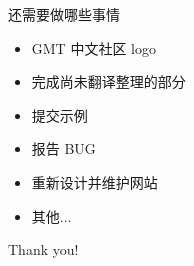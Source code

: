 \documentclass[UTF8, 11pt]{ctexbeamer}
\begin{document}
\begin{frame}{还需要做哪些事情}
\begin{itemize}
\item GMT 中文社区 logo
\item 完成尚未翻译整理的部分
\item 提交示例
\item 报告 BUG
\item 重新设计并维护网站
\item 其他...
\end{itemize}
\end{frame}

\begin{frame}
    \Large\centering Thank you!
\end{frame}
\end{document}
